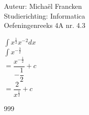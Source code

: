 \documentclass[a4paper]{article}
\newcommand{\dint}{\displaystyle\int}
\begin{document}
\noindent \large Auteur: Michaël Francken \\
\noindent \large Studierichting: Informatica\\
\noindent \large Oefeningenreeks 4A nr. 4.3\\

\medskip 

\normalsize

$\dint x^{\tfrac{1}{2}}x^{-2}dx$\\

$\dint x^{-\tfrac{3}{2}}$\\

$=\dfrac{x^{-\tfrac{1}{2}}}{-\dfrac{1}{2}}+c$\\

$=\dfrac{2}{x^{\tfrac{1}{2}}}+c$\\


\begin{thebibliography}{999}
\end{thebibliography}
\end{document}

